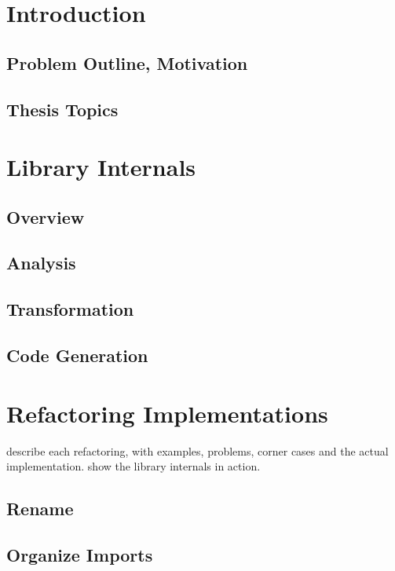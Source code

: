\documentclass[10pt,a4paper,oneside]{scrreprt}
\begin{document}


\newpage

\setcounter{tocdepth}{2}

\tableofcontents

\newpage


\chapter{Introduction}
\section{Problem Outline, Motivation}
\section{Thesis Topics}

\chapter{Library Internals}
\section{Overview}
\section{Analysis}
\section{Transformation}
\section{Code Generation}


\chapter{Refactoring Implementations}

describe each refactoring, with examples, problems, corner cases and the actual implementation. show the library internals in action.

\section{Rename}
\section{Organize Imports}
\end{document}
